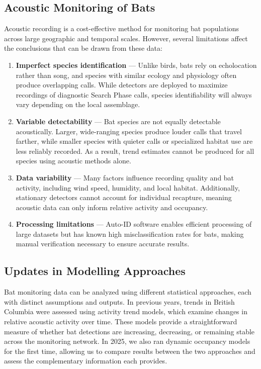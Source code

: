 \documentclass[
  letterpaper,
  DIV=11,
  numbers=noendperiod]{scrartcl}
\begin{document}
\newpage{}

\subsection{Acoustic Monitoring of
Bats}\label{acoustic-monitoring-of-bats}

Acoustic recording is a cost-effective method for monitoring bat
populations across large geographic and temporal scales. However,
several limitations affect the conclusions that can be drawn from these
data:

\begin{enumerate}
\def\labelenumi{\arabic{enumi}.}
\item
  \textbf{Imperfect species identification} --- Unlike birds, bats rely
  on echolocation rather than song, and species with similar ecology and
  physiology often produce overlapping calls. While detectors are
  deployed to maximize recordings of diagnostic Search Phase calls,
  species identifiability will always vary depending on the local
  assemblage.
\item
  \textbf{Variable detectability} --- Bat species are not equally
  detectable acoustically. Larger, wide-ranging species produce louder
  calls that travel farther, while smaller species with quieter calls or
  specialized habitat use are less reliably recorded. As a result, trend
  estimates cannot be produced for all species using acoustic methods
  alone.
\item
  \textbf{Data variability} --- Many factors influence recording quality
  and bat activity, including wind speed, humidity, and local habitat.
  Additionally, stationary detectors cannot account for individual
  recapture, meaning acoustic data can only inform relative activity and
  occupancy.
\item
  \textbf{Processing limitations} --- Auto-ID software enables efficient
  processing of large datasets but has known high misclassification
  rates for bats, making manual verification necessary to ensure
  accurate results.
\end{enumerate}

\subsection{Updates in Modelling
Approaches}\label{updates-in-modelling-approaches}

Bat monitoring data can be analyzed using different statistical
approaches, each with distinct assumptions and outputs. In previous
years, trends in British Columbia were assessed using activity trend
models, which examine changes in relative acoustic activity over time.
These models provide a straightforward measure of whether bat detections
are increasing, decreasing, or remaining stable across the monitoring
network. In 2025, we also ran dynamic occupancy models for the first
time, allowing us to compare results between the two approaches and
assess the complementary information each provides.
\end{document}
